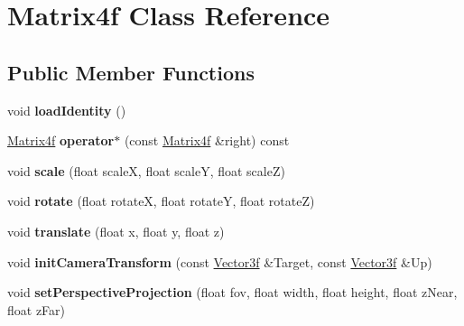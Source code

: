 \hypertarget{class_matrix4f}{\section{Matrix4f Class Reference}
\label{class_matrix4f}
}
\subsection*{Public Member Functions}
\begin{DoxyCompactItemize}
\item 
\hypertarget{class_matrix4f_a2f8f4e92e237de33d75f1c366a8b4a26}{void {\bfseries load\-Identity} ()}\label{class_matrix4f_a2f8f4e92e237de33d75f1c366a8b4a26}

\item 
\hypertarget{class_matrix4f_ae58b7a65a8359f7dc22c274c713c730b}{\hyperlink{class_matrix4f}{Matrix4f} {\bfseries operator$\ast$} (const \hyperlink{class_matrix4f}{Matrix4f} \&right) const }\label{class_matrix4f_ae58b7a65a8359f7dc22c274c713c730b}

\item 
\hypertarget{class_matrix4f_ada569de3b7d770022179a3f6ffea319e}{void {\bfseries scale} (float scale\-X, float scale\-Y, float scale\-Z)}\label{class_matrix4f_ada569de3b7d770022179a3f6ffea319e}

\item 
\hypertarget{class_matrix4f_a37dccdcdf5f17ba4ead14236834543c6}{void {\bfseries rotate} (float rotate\-X, float rotate\-Y, float rotate\-Z)}\label{class_matrix4f_a37dccdcdf5f17ba4ead14236834543c6}

\item 
\hypertarget{class_matrix4f_a1c8593a5ad9e0a0bc349a446abd01e65}{void {\bfseries translate} (float x, float y, float z)}\label{class_matrix4f_a1c8593a5ad9e0a0bc349a446abd01e65}

\item 
\hypertarget{class_matrix4f_a2093ce7f38ec2d4beb07453d30367ecd}{void {\bfseries init\-Camera\-Transform} (const \hyperlink{struct_vector3f}{Vector3f} \&Target, const \hyperlink{struct_vector3f}{Vector3f} \&Up)}\label{class_matrix4f_a2093ce7f38ec2d4beb07453d30367ecd}

\item 
\hypertarget{class_matrix4f_a4304bf4c86971bde01430f359b848c8a}{void {\bfseries set\-Perspective\-Projection} (float fov, float width, float height, float z\-Near, float z\-Far)}\label{class_matrix4f_a4304bf4c86971bde01430f359b848c8a}

\end{DoxyCompactItemize}
